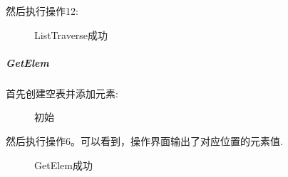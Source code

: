 \documentclass[supercite]{Experimental_Report}
\theoremstyle{definition}
\begin{document}
\clearpage
\noindent
然后执行操作12:
\begin{figure}[htbp]
	\centering
	\centering
	\caption{ListTraverse成功}
	\label{fig1-21}
\end{figure}

\subparagraph{GetElem}
\noindent
首先创建空表并添加元素:
\begin{figure}[htbp]
	\centering
	\centering
	\centering
	\caption{初始}
	\label{fig1-22}
\end{figure}

\noindent
然后执行操作6。可以看到，操作界面输出了对应位置的元素值.
\begin{figure}[htbp]
	\centering
	\centering
	\caption{GetElem成功}
	\label{fig1-23}
\end{figure}
\end{document}
